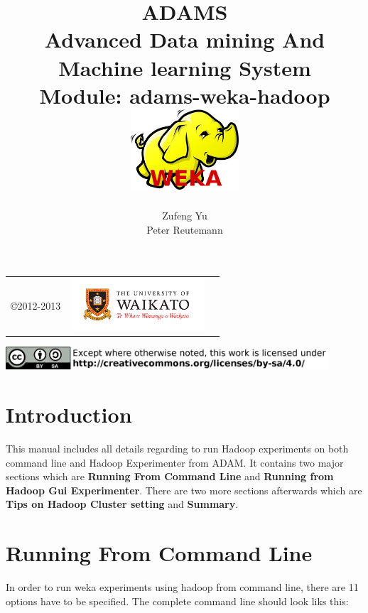 \documentclass[a4paper]{book}
\title{
  \textbf{ADAMS} \\
  {\Large \textbf{A}dvanced \textbf{D}ata mining \textbf{A}nd \textbf{M}achine
  learning \textbf{S}ystem} \\
  {\Large Module: adams-weka-hadoop} \\
  \vspace{1cm}
  \includegraphics[width=4cm]{images/hadoop.png} \\
}
\author{
  Zufeng Yu \\
  Peter Reutemann
}
\begin{document}
\begin{titlepage}
\maketitle

\thispagestyle{empty}
\center
\begin{table}[b]
	\begin{tabular}{c l l}
		\parbox[c][2cm]{2cm}{\copyright 2012-2013} &
		\parbox[c][2cm]{5cm}{\includegraphics[width=5cm]{images/coat_of_arms.pdf}} \\
	\end{tabular}
	\includegraphics[width=12cm]{images/cc.png} \\
\end{table}

\end{titlepage}

\tableofcontents
\listoffigures

\chapter{Introduction}
\noindent This manual includes all details regarding to run Hadoop experiments
on both command line and Hadoop Experimenter from ADAM. It contains two major
sections which are \textbf{Running From Command Line} and \textbf{Running from Hadoop Gui
Experimenter}. There are two more sections afterwards which are \textbf{Tips on
Hadoop Cluster setting} and \textbf{Summary}.
\chapter{Running From Command Line}
\noindent In order to run weka experiments using hadoop from command line, there
are 11 options have to be specified. The complete command line should look
liks this:
\end{document}
